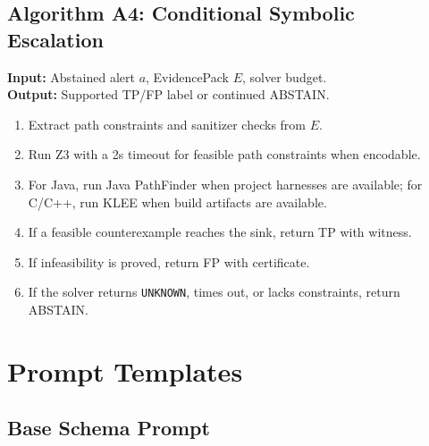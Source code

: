 \subsection{Algorithm A4: Conditional Symbolic Escalation}

\begin{algorithm}[h]
\label{alg:symbolic}
\textbf{Input:} Abstained alert $a$, EvidencePack $E$, solver budget.\\
\textbf{Output:} Supported TP/FP label or continued ABSTAIN.
\begin{enumerate}
\item Extract path constraints and sanitizer checks from $E$.
\item Run Z3 with a 2s timeout for feasible path constraints when encodable.
\item For Java, run Java PathFinder when project harnesses are available; for C/C++, run KLEE when build artifacts are available.
\item If a feasible counterexample reaches the sink, return TP with witness.
\item If infeasibility is proved, return FP with certificate.
\item If the solver returns \texttt{UNKNOWN}, times out, or lacks constraints, return ABSTAIN.
\end{enumerate}
\end{algorithm}

\section{Prompt Templates}
\label{app:prompts}

\subsection{Base Schema Prompt}

